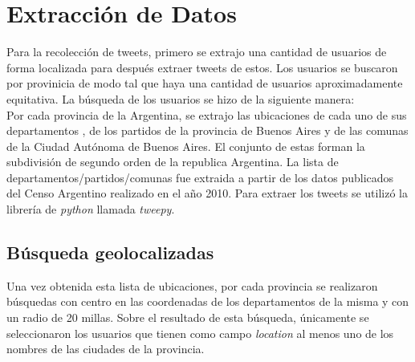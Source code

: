 

\section{Extracción de Datos}

Para la recolección de tweets, primero se extrajo una cantidad de usuarios de forma localizada para después extraer tweets de estos.
Los usuarios se buscaron por provinicia de modo tal que haya una cantidad de usuarios aproximadamente equitativa.
La búsqueda de los usuarios se hizo de la siguiente manera:\\
Por cada provincia de la Argentina, se extrajo las ubicaciones de cada uno de sus departamentos , de los partidos de la provincia de Buenos Aires y de las comunas de la Ciudad Autónoma de Buenos Aires. El conjunto de estas forman la subdivisión de segundo orden de la republica Argentina. La lista de departamentos/partidos/comunas fue extraida a partir de los datos publicados del Censo Argentino realizado en el año 2010. Para extraer los tweets se utilizó la librería de \textit{python} llamada \textit{tweepy}.



\subsection{Búsqueda geolocalizadas}
Una vez obtenida esta lista de ubicaciones, por cada provincia se realizaron búsquedas con centro en las coordenadas de los departamentos de la misma y con un radio de 20 millas. Sobre el resultado de esta búsqueda, únicamente se seleccionaron los usuarios que tienen como campo \textit{location} al menos uno de los nombres de las ciudades de la provincia.

